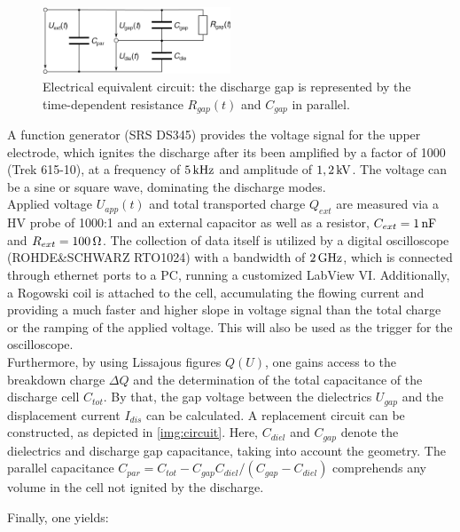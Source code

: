 \documentclass[a4paper,10pt]{article}
\begin{document}
				\begin{figure}
					\centering
					\includegraphics[width=0.5\textwidth]{figures/setup/replacementcircuit}
					\caption{Electrical equivalent circuit: the discharge gap is represented by the time-dependent resistance $R_{gap}(t)$ and $C_{gap}$ in parallel.}
					\label{img:circuit}
				\end{figure}
		
					 
			 A function generator (SRS DS345) provides the voltage signal for the upper electrode, which ignites the discharge after its been amplified by a factor of 1000 (Trek 615-10), at a frequency of $\unit[5]{kHz}$ and amplitude of $\unit[1,2]{kV}$. The voltage can be a sine or square wave, dominating the discharge modes.\\
			 Applied voltage $U_{app}(t)$ and total transported charge $Q_{ext}$ are measured via a HV probe of 1000:1 and an external capacitor as well as a resistor, $C_{ext}=\unit[1]{nF}$ and $R_{ext}=\unit[100]{\Omega}$. The collection of data itself is utilized by a digital oscilloscope (ROHDE\&SCHWARZ RTO1024) with a bandwidth of $\unit[2]{GHz}$, which is connected through ethernet ports to a PC, running a customized LabView VI. Additionally, a Rogowski coil is attached to the cell, accumulating the flowing current and providing a much faster and higher slope in voltage signal than the total charge or the ramping of the applied voltage. This will also be used as the trigger for the oscilloscope.\\
			 Furthermore, by using Lissajous figures $Q(U)$, one gains access to the breakdown charge $\Delta Q$ and the determination of the total capacitance of the discharge cell $C_{tot}$. By that, the gap voltage between the dielectrics $U_{gap}$ and the displacement current $I_{dis}$ can be calculated. A replacement circuit can be constructed, as depicted in \autoref{img:circuit}. Here, $C_{diel}$ and $C_{gap}$ denote the dielectrics and discharge gap capacitance, taking into account the geometry. The parallel capacitance $C_{par}=C_{tot}-C_{gap}C_{diel}/\left(C_{gap}-C_{diel}\right)$ comprehends any volume in the cell not ignited by the discharge.
			 
			 \clearpage
			 
			 Finally, one yields:
			 
\end{document}
